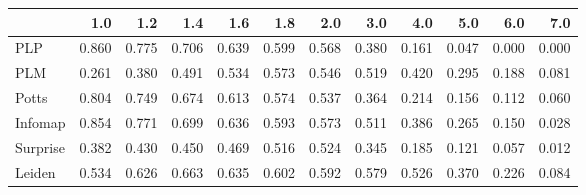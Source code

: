 \begin{tabular}{lrrrrrrrrrrr}
\toprule
{} &   1.0 &   1.2 &   1.4 &   1.6 &   1.8 &   2.0 &   3.0 &   4.0 &   5.0 &   6.0 &   7.0 \\
\midrule
PLP      & 0.860 & 0.775 & 0.706 & 0.639 & 0.599 & 0.568 & 0.380 & 0.161 & 0.047 & 0.000 & 0.000 \\
PLM      & 0.261 & 0.380 & 0.491 & 0.534 & 0.573 & 0.546 & 0.519 & 0.420 & 0.295 & 0.188 & 0.081 \\
Potts    & 0.804 & 0.749 & 0.674 & 0.613 & 0.574 & 0.537 & 0.364 & 0.214 & 0.156 & 0.112 & 0.060 \\
Infomap  & 0.854 & 0.771 & 0.699 & 0.636 & 0.593 & 0.573 & 0.511 & 0.386 & 0.265 & 0.150 & 0.028 \\
Surprise & 0.382 & 0.430 & 0.450 & 0.469 & 0.516 & 0.524 & 0.345 & 0.185 & 0.121 & 0.057 & 0.012 \\
Leiden   & 0.534 & 0.626 & 0.663 & 0.635 & 0.602 & 0.592 & 0.579 & 0.526 & 0.370 & 0.226 & 0.084 \\
\bottomrule
\end{tabular}
